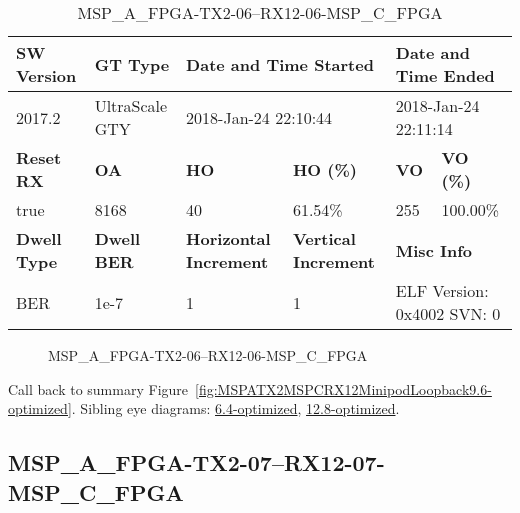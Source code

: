 \begin{table}[h]
\centering
\caption{MSP\_A\_FPGA-TX2-06--RX12-06-MSP\_C\_FPGA}
\label{tab:MSPAFPGATX206RX1206MSPCFPGA9.6-optimized}
\begin{tabular}{@{}|l|l|l|l|l|l|@{}}
\toprule
\textbf{SW Version}                & \textbf{GT Type}   & \multicolumn{2}{l|}{\textbf{Date and Time Started}}            & \multicolumn{2}{l|}{\textbf{Date and Time Ended}}        \\ \midrule
2017.2                       & UltraScale GTY          & \multicolumn{2}{l|}{2018-Jan-24 22:10:44}                   & \multicolumn{2}{l|}{2018-Jan-24 22:11:14}               \\ \midrule
\textbf{Reset RX}                  & \textbf{OA} & \textbf{HO}   & \textbf{HO (\%)} & \textbf{VO} & \textbf{VO (\%)} \\ \midrule
true & 8168        & 40          & 61.54\%        & 255        & 100.00\%       \\ \midrule
\textbf{Dwell Type}                & \textbf{Dwell BER} & \textbf{Horizontal Increment} & \textbf{Vertical Increment}    & \multicolumn{2}{l|}{\textbf{Misc Info}}                  \\ \midrule
BER                            & 1e-7        & 1        & 1           & \multicolumn{2}{l|}{ELF Version: 0x4002 SVN: 0}                         \\ \bottomrule
\end{tabular}
\end{table}

\begin{figure}[h]
\caption{MSP\_A\_FPGA-TX2-06--RX12-06-MSP\_C\_FPGA} \label{fig:MSPAFPGATX206RX1206MSPCFPGA9.6-optimized}
\end{figure}

Call back to summary Figure~\ref{fig:MSPATX2MSPCRX12MinipodLoopback9.6-optimized}.
Sibling eye diagrams: \hyperref[sec:MSPAFPGATX206RX1206MSPCFPGA6.4-optimized]{6.4-optimized}, \hyperref[sec:MSPAFPGATX206RX1206MSPCFPGA12.8-optimized]{12.8-optimized}.

\clearpage
\newpage


\subsection{MSP\_A\_FPGA-TX2-07--RX12-07-MSP\_C\_FPGA}\label{sec:MSPAFPGATX207RX1207MSPCFPGA9.6-optimized}

